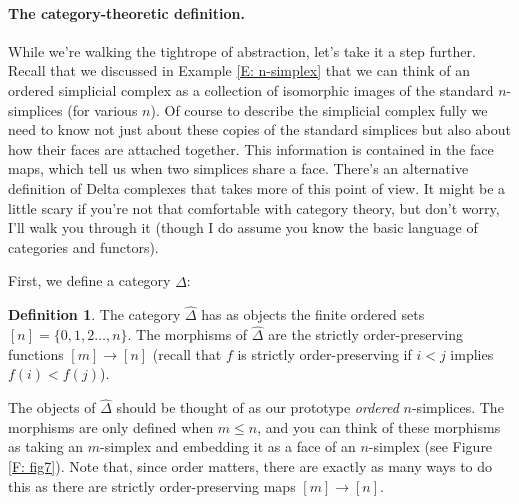 \documentclass[12pt]{article}
\theoremstyle{plain}
\theoremstyle{definition}
\newtheorem{definition}[theorem]{Definition}
\theoremstyle{remark}
\begin{document}
\paragraph{The category-theoretic definition.}
While we're walking the tightrope of abstraction, let's take it a step further. Recall that 
we discussed in Example \ref{E: n-simplex} that we can think of an ordered simplicial complex as a collection of isomorphic  images of the standard $n$-simplices (for various $n$). Of course to describe the simplicial complex fully we need to know not just about these copies of the  standard simplices but also about how their  faces are attached together. This  information is contained in the face maps, which tell us when two simplices share a face. There's an alternative definition of Delta complexes that takes more of this point of view. It might be a little scary if you're not that comfortable with category theory, but don't worry, I'll walk you through it (though I do assume you know the basic language of categories and functors). 

First, we define a category $\widehat \Delta$:

\begin{definition} The category $\widehat \Delta$ has as  objects  the finite ordered sets $[n]=\{0,1,2\ldots, n\}$.  The morphisms of $\widehat \Delta$ are the strictly order-preserving functions $[m]\to [n]$ (recall that $f$ is strictly order-preserving if $i<j$ implies $f(i)<f(j)$).
\end{definition}


The objects of $\widehat \Delta$ should be thought of as our prototype \emph{ordered} $n$-simplices. The morphisms are only defined when $m\leq n$, and you can think of these morphisms as taking an $m$-simplex and embedding it as a face of an $n$-simplex (see Figure \ref{F: fig7}). Note that, since order matters, there are exactly as many ways to do this as there are strictly order-preserving maps $[m]\to [n]$.  
\end{document}

